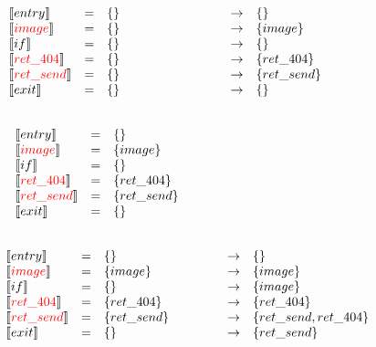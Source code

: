 \begin{frame}
\[
\begin{array}{lclcl}
  \constraint{entry} & = & \{\} & \rightarrow & \{\}\\
  \assignconstraint{image} & = & \{\} & \rightarrow &\{image\}\\
  \constraint{if} & = & \{\} & \rightarrow &\{\}\\
  \assignconstraint{ret\_404} & = & \{\} & \rightarrow &\{ret\_404\}\\
  \assignconstraint{ret\_send} & = & \{\} & \rightarrow &\{ret\_send\}\\
  \constraint{exit} & = & \{\} & \rightarrow & \{\}\\
  && \phantom{\{command, param\}} && \phantom{\{command, param\}}
\end{array}
\]
\end{frame}

\begin{frame}
\[
\begin{array}{lclcl}
  \constraint{entry} & = & \{\} &&\\
  \assignconstraint{image} & = & \{image\} &&\\
  \constraint{if} & = & \{\} &&\\
  \assignconstraint{ret\_404} & = & \{ret\_404\} &&\\
  \assignconstraint{ret\_send} & = & \{ret\_send\} &&\\
  \constraint{exit} & = & \{\} &&\\
  && \phantom{\{command, param\}} && \phantom{\{command, param\}}
\end{array}
\]
\end{frame}

\begin{frame}
\[
\begin{array}{lclcl}
  \constraint{entry} & = & \{\} & \rightarrow & \{\}\\
  \assignconstraint{image} & = & \{image\} & \rightarrow &\{image\}\\
  \constraint{if} & = & \{\} & \rightarrow &\{image\}\\
  \assignconstraint{ret\_404} & = & \{ret\_404\} & \rightarrow &\{ret\_404\}\\
  \assignconstraint{ret\_send} & = & \{ret\_send\} & \rightarrow &\{ret\_send, ret\_404\}\\
  \constraint{exit} & = & \{\} & \rightarrow & \{ret\_send\}\\
  && \phantom{\{command, param\}} && \phantom{\{command, param\}}
\end{array}
\]
\end{frame}


